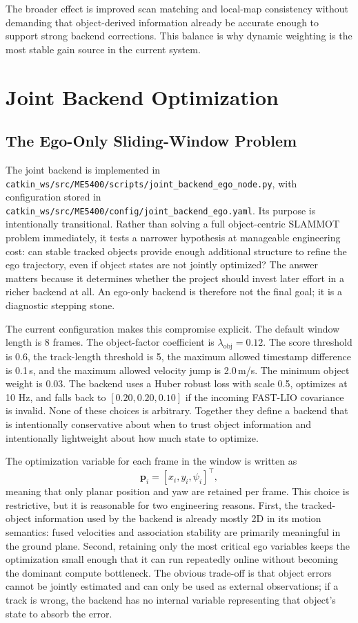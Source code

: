 \documentclass[a4paper,12pt]{article}
\newcommand{\code}[1]{\nolinkurl{#1}}
\begin{document}
The broader effect is improved scan matching and local-map consistency without demanding that object-derived information already be accurate enough to support strong backend corrections. This balance is why dynamic weighting is the most stable gain source in the current system.

\section{Joint Backend Optimization}
\subsection{The Ego-Only Sliding-Window Problem}
The joint backend is implemented in \code{catkin_ws/src/ME5400/scripts/joint_backend_ego_node.py}, with configuration stored in \code{catkin_ws/src/ME5400/config/joint_backend_ego.yaml}. Its purpose is intentionally transitional. Rather than solving a full object-centric SLAMMOT problem immediately, it tests a narrower hypothesis at manageable engineering cost: can stable tracked objects provide enough additional structure to refine the ego trajectory, even if object states are not jointly optimized? The answer matters because it determines whether the project should invest later effort in a richer backend at all. An ego-only backend is therefore not the final goal; it is a diagnostic stepping stone.

The current configuration makes this compromise explicit. The default window length is 8 frames. The object-factor coefficient is \(\lambda_{\mathrm{obj}}=0.12\). The score threshold is 0.6, the track-length threshold is 5, the maximum allowed timestamp difference is 0.1\,s, and the maximum allowed velocity jump is 2.0\,m/s. The minimum object weight is 0.03. The backend uses a Huber robust loss with scale 0.5, optimizes at 10 Hz, and falls back to \([0.20, 0.20, 0.10]\) if the incoming FAST-LIO covariance is invalid. None of these choices is arbitrary. Together they define a backend that is intentionally conservative about when to trust object information and intentionally lightweight about how much state to optimize.

The optimization variable for each frame in the window is written as
\begin{equation}
\mathbf{p}_i=[x_i, y_i, \psi_i]^\top,
\end{equation}
meaning that only planar position and yaw are retained per frame. This choice is restrictive, but it is reasonable for two engineering reasons. First, the tracked-object information used by the backend is already mostly 2D in its motion semantics: fused velocities and association stability are primarily meaningful in the ground plane. Second, retaining only the most critical ego variables keeps the optimization small enough that it can run repeatedly online without becoming the dominant compute bottleneck. The obvious trade-off is that object errors cannot be jointly estimated and can only be used as external observations; if a track is wrong, the backend has no internal variable representing that object's state to absorb the error.
\end{document}
